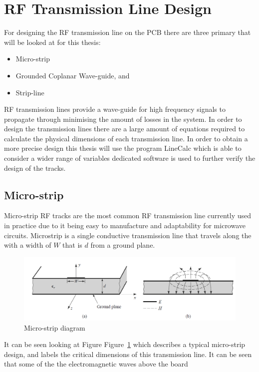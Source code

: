 \documentclass[12pt,openany,a4paper]{book}
\newcommand{\fig}[1]  {Figure~\ref{#1}}		%
\begin{document}
\section{RF Transmission Line Design}
For designing the RF transmission line on the PCB there are three primary that will be looked at for this thesis:\\[-0.8cm]
\begin{itemize}
	\setlength\itemsep{-0.5em}
	\item Micro-strip
	\item Grounded Coplanar Wave-guide, and
	\item Strip-line
\end{itemize}
RF transmission lines provide a wave-guide for high frequency signals to propagate through minimising the amount of losses in the system. In order to design the transmission lines there are a large amount of equations required to calculate the physical dimensions of each transmission line. In order to obtain a more precise design this thesis will use the program LineCalc which is able to consider a wider range of variables dedicated software is  used to further verify the design of the tracks.

\subsection{Micro-strip}
Micro-strip RF tracks are the most common RF transmission line currently used in practice due to it being easy to manufacture and adaptability for microwave circuits. \cite{ref9} Microstrip is a single conductive transmission line that travels along the with a width of $W$ that is $d$ from a ground plane.
\begin{figure}[H]
	\centering
    \includegraphics[width=1\textwidth]{microstrip.png}
	\caption{Micro-strip diagram}
	\label{fig:microdiag}
\end{figure} 
It can be seen looking at Figure \fig{fig:microdiag} which describes a typical micro-strip design, and labels the critical dimensions of this transmission line. It can be seen that some of the the electromagnetic waves above the board  
\end{document}
